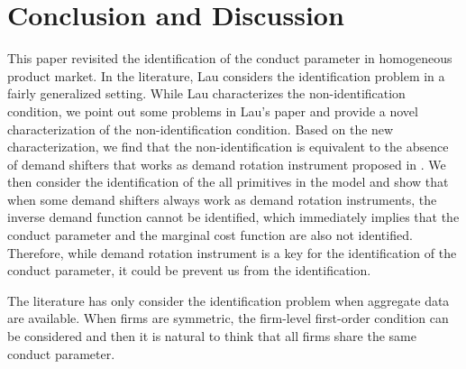 \documentclass[11pt, a4paper]{article}
\newtheorem{proposition}{Proposition}
\theoremstyle{remark}
\begin{document}

\section{Conclusion and Discussion}\label{sec:conclusion}

This paper revisited the identification of the conduct parameter in homogeneous product market.
In the literature, Lau considers the identification problem in a fairly generalized setting.
While Lau characterizes the non-identification condition, we point out some problems in Lau's paper and provide a novel characterization of the non-identification condition.
Based on the new characterization, we find that the non-identification is equivalent to the absence of demand shifters that works as demand rotation instrument proposed in \citet{bresnahan1982oligopoly}.
We then consider the identification of the all primitives in the model and show that when some demand shifters always work as demand rotation instruments, the inverse demand function cannot be identified, which immediately implies that the conduct parameter and the marginal cost function are also not identified.
Therefore, while demand rotation instrument is a key for the identification of the conduct parameter, it could be prevent us from the identification.



The literature has only consider the identification problem when aggregate data are available.
When firms are symmetric, the firm-level first-order condition can be considered and then it is natural to think that all firms share the same conduct parameter.
\end{document}
